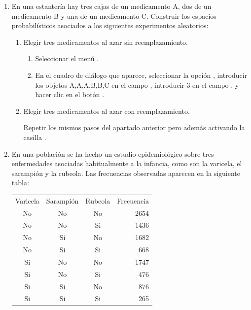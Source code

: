 \begin{enumerate}[leftmargin=*]
\item En una estantería hay tres cajas de un medicamento A, dos de un medicamento B y una de un medicamento C. 
Construir los espacios probabilísticos asociados a los siguientes experimentos aleatorios:
\begin{enumerate}
\item Elegir tres medicamentos al azar sin reemplazamiento. 
\begin{indicacion}{
\begin{enumerate}
\item Seleccionar el menú .
\item En el cuadro de diálogo que aparece, seleccionar la opción , introducir los objetos A,A,A,B,B,C en
el campo , introducir 3 en el campo , y hacer clic en el botón .
\end{enumerate}
}
\end{indicacion}

\item Elegir tres medicamentos al azar con reemplazamiento.
\begin{indicacion}{
Repetir los mismos pasos del apartado anterior pero además activando la casilla .
}
\end{indicacion}
\end{enumerate}

\item En una población se ha hecho un estudio epidemiológico sobre tres enfermedades asociadas habitualmente a la infancia, como son la
varicela, el sarampión y la rubeola.
Las frecuencias observadas aparecen en la siguiente tabla:
\begin{center}
\begin{tabular}{cccr}
\hline
Varicela & Sarampión & Rubeola & Frecuencia\\
No & No & No & 2654\\
No & No & Si & 1436\\
No & Si & No & 1682\\
No & Si & Si & 668\\
Si & No & No & 1747\\
Si & No & Si & 476\\
Si & Si & No & 876\\
Si & Si & Si & 265\\
\hline
\end{tabular}
\end{center}


\end{enumerate}
